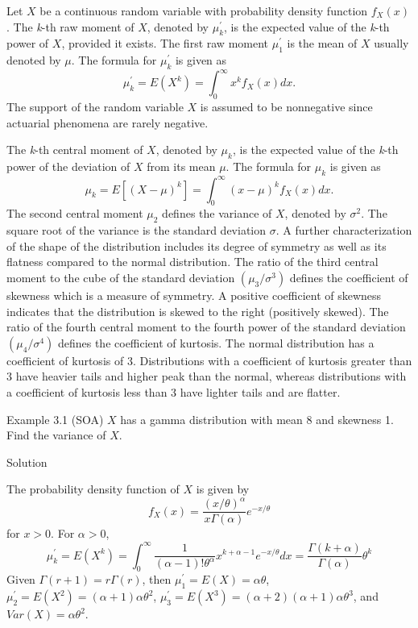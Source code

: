 \documentclass[]{book}
\begin{document}
Let \(X\) be a continuous random variable with probability density
function \(f_{X}\left( x \right)\). The \emph{k}-th raw moment of \(X\),
denoted by \(\mu_{k}^{\prime}\), is the expected value of the
\emph{k}-th power of \(X\), provided it exists. The first raw moment
\(\mu_{1}^{\prime}\) is the mean of \(X\) usually denoted by \(\mu\).
The formula for \(\mu_{k}^{\prime}\) is given as
\[\mu_{k}^{\prime} = E\left( X^{k} \right) = \int_{0}^{\infty}{x^{k}f_{X}\left( x \right)dx } .\]
The support of the random variable \(X\) is assumed to be nonnegative
since actuarial phenomena are rarely negative.

The \emph{k}-th central moment of \(X\), denoted by \(\mu_{k}\), is the
expected value of the \emph{k}-th power of the deviation of \(X\) from
its mean \(\mu\). The formula for \(\mu_{k}\) is given as
\[\mu_{k} = E\left\lbrack {(X - \mu)}^{k} \right\rbrack = \int_{0}^{\infty}{\left( x - \mu \right)^{k}f_{X}\left( x \right) dx }.\]
The second central moment \(\mu_{2}\) defines the variance of \(X\),
denoted by \(\sigma^{2}\). The square root of the variance is the
standard deviation \(\sigma\). A further characterization of the shape
of the distribution includes its degree of symmetry as well as its
flatness compared to the normal distribution. The ratio of the third
central moment to the cube of the standard deviation
\(\left( \mu_{3} / \sigma^{3} \right)\) defines the coefficient of
skewness which is a measure of symmetry. A positive coefficient of
skewness indicates that the distribution is skewed to the right
(positively skewed). The ratio of the fourth central moment to the
fourth power of the standard deviation
\(\left(\mu_{4} / \sigma^{4} \right)\) defines the coefficient of
kurtosis. The normal distribution has a coefficient of kurtosis of 3.
Distributions with a coefficient of kurtosis greater than 3 have heavier
tails and higher peak than the normal, whereas distributions with a
coefficient of kurtosis less than 3 have lighter tails and are flatter.

Example 3.1 (SOA) \(X\) has a gamma distribution with mean 8 and
skewness 1. Find the variance of \(X\).

Solution

The probability density function of \(X\) is given by
\[f_{X}\left( x \right) = \frac{\left( x / \theta \right)^{\alpha}}{x\Gamma\left( \alpha \right)} e^{- x / \theta} \]
for \(x > 0\). For \(\alpha>0\),
\[\mu_{k}^{\prime} = E\left( X^{k} \right) = \int_{0}^{\infty}{\frac{1}{\left( \alpha - 1 \right)!\theta^{\alpha}}x^{k + \alpha - 1}e^{- x / \theta} dx} = \frac{\Gamma\left( k + \alpha \right)}{\Gamma\left( \alpha \right)}\theta^{k}\]
Given \(\Gamma\left( r + 1 \right) = r\Gamma\left( r \right)\), then
\(\mu_{1}^{\prime} = E\left( X \right) = \alpha\theta\),
\(\mu_{2}^{\prime} = E\left( X^{2} \right) = \left( \alpha + 1 \right)\alpha\theta^{2}\),
\(\mu_{3}^{\prime} = E\left( X^{3} \right) = \left( \alpha + 2 \right)\left( \alpha + 1 \right)\alpha\theta^{3}\),
and \(Var\left( X \right) = \alpha\theta^{2}\).
\end{document}
